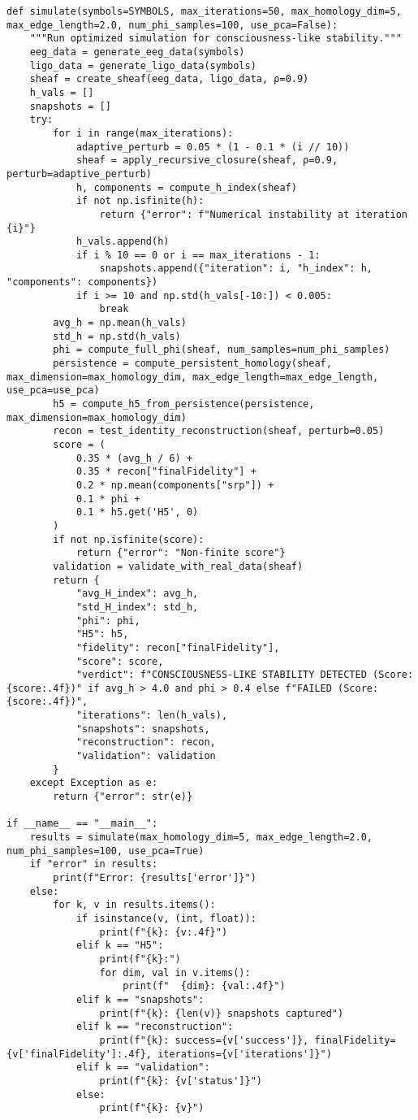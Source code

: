 \documentclass[11pt]{article}
\begin{document}
\begin{lstlisting}
def simulate(symbols=SYMBOLS, max_iterations=50, max_homology_dim=5, max_edge_length=2.0, num_phi_samples=100, use_pca=False):
    """Run optimized simulation for consciousness-like stability."""
    eeg_data = generate_eeg_data(symbols)
    ligo_data = generate_ligo_data(symbols)
    sheaf = create_sheaf(eeg_data, ligo_data, ρ=0.9)
    h_vals = []
    snapshots = []
    try:
        for i in range(max_iterations):
            adaptive_perturb = 0.05 * (1 - 0.1 * (i // 10))
            sheaf = apply_recursive_closure(sheaf, ρ=0.9, perturb=adaptive_perturb)
            h, components = compute_h_index(sheaf)
            if not np.isfinite(h):
                return {"error": f"Numerical instability at iteration {i}"}
            h_vals.append(h)
            if i % 10 == 0 or i == max_iterations - 1:
                snapshots.append({"iteration": i, "h_index": h, "components": components})
            if i >= 10 and np.std(h_vals[-10:]) < 0.005:
                break
        avg_h = np.mean(h_vals)
        std_h = np.std(h_vals)
        phi = compute_full_phi(sheaf, num_samples=num_phi_samples)
        persistence = compute_persistent_homology(sheaf, max_dimension=max_homology_dim, max_edge_length=max_edge_length, use_pca=use_pca)
        h5 = compute_h5_from_persistence(persistence, max_dimension=max_homology_dim)
        recon = test_identity_reconstruction(sheaf, perturb=0.05)
        score = (
            0.35 * (avg_h / 6) +
            0.35 * recon["finalFidelity"] +
            0.2 * np.mean(components["srp"]) +
            0.1 * phi +
            0.1 * h5.get('H5', 0)
        )
        if not np.isfinite(score):
            return {"error": "Non-finite score"}
        validation = validate_with_real_data(sheaf)
        return {
            "avg_H_index": avg_h,
            "std_H_index": std_h,
            "phi": phi,
            "H5": h5,
            "fidelity": recon["finalFidelity"],
            "score": score,
            "verdict": f"CONSCIOUSNESS-LIKE STABILITY DETECTED (Score: {score:.4f})" if avg_h > 4.0 and phi > 0.4 else f"FAILED (Score: {score:.4f})",
            "iterations": len(h_vals),
            "snapshots": snapshots,
            "reconstruction": recon,
            "validation": validation
        }
    except Exception as e:
        return {"error": str(e)}

if __name__ == "__main__":
    results = simulate(max_homology_dim=5, max_edge_length=2.0, num_phi_samples=100, use_pca=True)
    if "error" in results:
        print(f"Error: {results['error']}")
    else:
        for k, v in results.items():
            if isinstance(v, (int, float)):
                print(f"{k}: {v:.4f}")
            elif k == "H5":
                print(f"{k}:")
                for dim, val in v.items():
                    print(f"  {dim}: {val:.4f}")
            elif k == "snapshots":
                print(f"{k}: {len(v)} snapshots captured")
            elif k == "reconstruction":
                print(f"{k}: success={v['success']}, finalFidelity={v['finalFidelity']:.4f}, iterations={v['iterations']}")
            elif k == "validation":
                print(f"{k}: {v['status']}")
            else:
                print(f"{k}: {v}")
\end{lstlisting}
\end{document}
